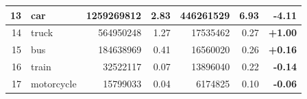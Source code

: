 \documentclass[a4paper,12pt]{report}
\begin{document}
\begin{table}[]
{\begin{tabular}{|r|l|r|r|r|r|r|}
            13                                                                                     & car           & 1259269812                          & 2.83                                                                                   & 446261529                                                                             & 6.93                                                                                        & \textbf{-4.11}                                                                                                   \\ \hline
            14                                                                                     & truck         & 564950248                           & 1.27                                                                                   & 17535462                                                                              & 0.27                                                                                        & \textbf{+1.00}                                                                                                   \\ \hline
            15                                                                                     & bus           & 184638969                           & 0.41                                                                                   & 16560020                                                                              & 0.26                                                                                        & \textbf{+0.16}                                                                                                   \\ \hline
            16                                                                                     & train         & 32522117                            & 0.07                                                                                   & 13896040                                                                              & 0.22                                                                                        & \textbf{-0.14}                                                                                                   \\ \hline
            17                                                                                     & motorcycle    & 15799033                            & 0.04                                                                                   & 6174825                                                                               & 0.10                                                                                        & \textbf{-0.06}                                                                                                   \\ \hline

\end{tabular}}
\end{table}
\end{document}

